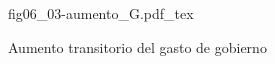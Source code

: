 \begin{figure}[h]
\centering
\def\svgwidth{0.5\textwidth}
{fig06_03-aumento_G.pdf_tex}
\caption{Aumento transitorio del gasto de gobierno}
\label{fig06_03-aumento_G}
\end{figure}